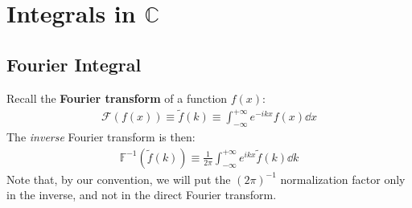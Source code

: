 \documentclass[../template.tex]{subfiles}
\begin{document}
\section{Integrals in $\mathbb{C}$}

\subsection{Fourier Integral}
Recall the \textbf{Fourier transform} of a function $f(x)$:
\begin{align*}
    \mathcal{F}(f(x)) \equiv \tilde{f}(k) \equiv \int_{-\infty}^{+\infty}  e^{-ikx} f(x) \dd{x}
\end{align*} 
The \textit{inverse} Fourier transform is then:
\begin{align*}
    \mathbb{F}^{-1}(\tilde{f}(k)) \equiv \frac{1}{2 \pi} \int_{-\infty}^{+\infty} e^{ikx} \tilde{f}(k)  \dd{k}
\end{align*} 
Note that, by our convention, we will put the $(2 \pi)^{-1}$ normalization factor only in the inverse, and not in the direct Fourier transform.
\end{document}

